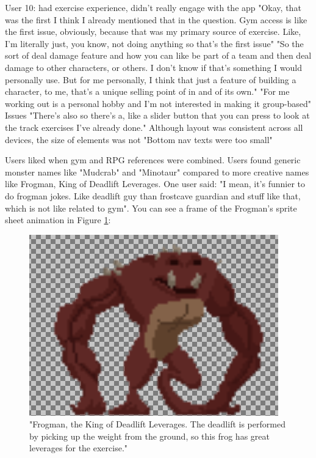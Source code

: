 \documentclass{l4proj}
\begin{document}
User 10: had exercise experience, didn't really engage with the app
  "Okay, that was the first I think I already mentioned that in the question. Gym access is like the first issue, obviously, because that was my primary source of exercise. Like, I'm literally just, you know, not doing anything so that's the first issue"
  "So the sort of deal damage feature and how you can like be part of a team and then deal damage to other characters, or others. I don't know if that's something I would personally use. But for me personally, I think that just a feature of building a character, to me, that's a unique selling point of in and of its own." 
  "For me working out is a personal hobby and I'm not interested in making it group-based"
  Issues  
    "There's also so there's a, like a slider button that you can press to look at the track exercises I've already done."
    Although layout was consistent across all devices, the size of elements was not
    "Bottom nav texts were too small"








Users liked when gym and RPG references were combined. Users found generic monster names like "Mudcrab" and "Minotaur" compared to more creative names like Frogman, King of Deadlift Leverages. One user said: "I mean, it's funnier to do frogman jokes. Like deadlift guy than frostcave guardian and stuff like that, which is not like related to gym". You can see a frame of the Frogman's sprite sheet animation in Figure \ref{fig:frogman}:

\begin{figure}[H]
    \centering
    \includegraphics[width=1.0\linewidth]{froggie.png}    
    \caption{
      "Frogman, the King of Deadlift Leverages. The deadlift is performed by picking up the weight from the ground, so this frog has great leverages for the exercise."
    }
    \label{fig:frogman} 
\end{figure}
\end{document}
